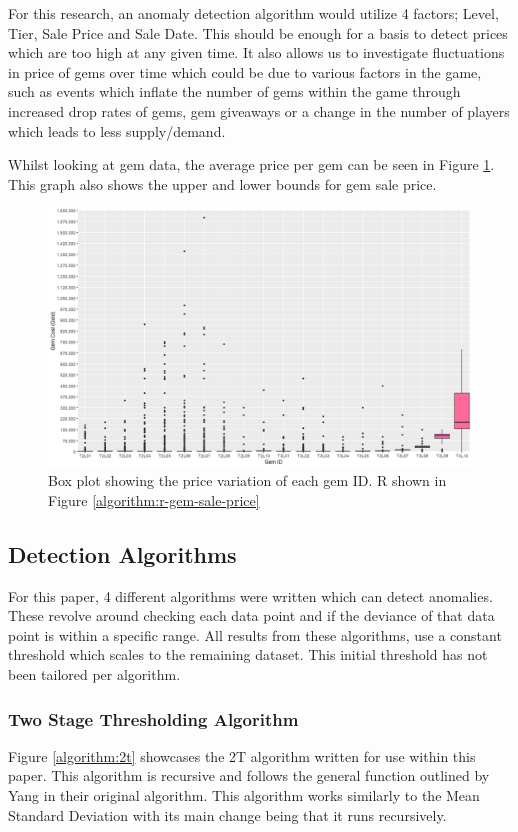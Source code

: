 \documentclass[journal]{IEEEtran}
\begin{document}
For this research, an anomaly detection algorithm would utilize 4 factors; Level, Tier, Sale Price and Sale Date. This should be enough for a basis to detect prices which are too high at any given time. It also allows us to investigate fluctuations in price of gems over time which could be due to various factors in the game, such as events which inflate the number of gems within the game through increased drop rates of gems, gem giveaways or a change in the number of players which leads to less supply/demand.

Whilst looking at gem data, the average price per gem can be seen in Figure \ref{graph:gem-sale-price}. This graph also shows the upper and lower bounds for gem sale price.
\begin{figure}[!h]
    \centering
    \includegraphics[width=12cm]{graph-gem-sale-prices.png}
    \caption{Box plot showing the price variation of each gem ID. R shown in Figure \ref{algorithm:r-gem-sale-price}}
    \label{graph:gem-sale-price}
\end{figure}

\subsection{Detection Algorithms}
For this paper, 4 different algorithms were written which can detect anomalies. These revolve around checking each data point and if the deviance of that data point is within a specific range. All results from these algorithms, use a constant threshold which scales to the remaining dataset. This initial threshold has not been tailored per algorithm.

\subsubsection{Two Stage Thresholding Algorithm}
Figure \ref{algorithm:2t} showcases the 2T algorithm written for use within this paper. This algorithm is recursive and follows the general function outlined by Yang\cite{Yang2019} in their original algorithm. This algorithm works similarly to the Mean Standard Deviation with its main change being that it runs recursively.
\end{document}
